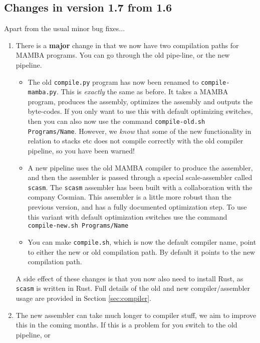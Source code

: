 \subsection{Changes in version 1.7 from 1.6}
Apart from the usual minor bug fixes...
\begin{enumerate}
  \item There is a {\bf major} change in that we now have two
  compilation paths for MAMBA programs. You can go through the
  old pipe-line, or the new pipeline.
  \begin{itemize}
     \item The old \verb+compile.py+ program has now been renamed
           to \verb+compile-mamba.py+. This is {\em exactly}
           the same as before. It takes a MAMBA program, produces
           the assembly, optimizes the assembly and outputs the
           byte-codes.
           If you only want to use this with default optimizing
           switches, then you can also now use the command
           \verb+compile-old.sh Programs/Name+.
           However, we {\em know} that some of the new functionality
           in relation to stacks etc does not compile correctly with
           the old compiler pipeline, so you have been warned!
     \item A new pipeline uses the old MAMBA compiler to produce the
           assembler, and then the assembler is passed through
           a special scale-assembler called \verb+scasm+.
           The \verb+scasm+ assembler has been built with a collaboration
           with the company Cosmian.
           This assembler is a little more robust than the previous
           version, and has a fully documented optimization step.
           To use this variant with default optimization switches
           use the command \verb+compile-new.sh Programs/Name+
     \item You can make \verb+compile.sh+, which is now the
           default compiler name, point to either the new or old
           compilation path. By default it points to the new
           compilation path.
  \end{itemize}
  A side effect of these changes is that you now also need to
  install Rust, as \verb+scasm+ is written in Rust.
  Full details of the old and new compiler/assembler usage
  are provided in Section \ref{sec:compiler}.
  \item 
  The new assembler can take much longer to compiler stuff, 
  we aim to improve this in the coming months. 
  If this is a problem for you switch to the old pipeline, or

\end{enumerate}
